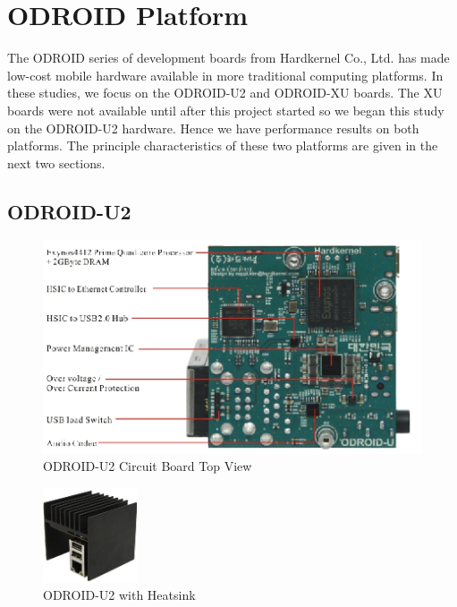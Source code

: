 \documentclass[11pt]{book}
\begin{document}
\section{ODROID Platform}

The ODROID series of development boards from Hardkernel Co., Ltd. has made low-cost mobile
hardware available in more traditional computing platforms.  In these studies, we focus on
the ODROID-U2 and ODROID-XU boards.  The XU boards were not available until after this
project started so we began this study on the ODROID-U2 hardware.  Hence we have
performance results on both platforms.  The principle characteristics of these two
platforms are given in the next two sections.

\subsection{ODROID-U2}

\begin{figure}
\includegraphics[width=\textwidth]{odroid_u2_top}
\caption{ODROID-U2 Circuit Board Top View \cite{odroid-u2-board-detail}}\label{odroid-u2-board}
\end{figure}

\begin{figure}
\centering
\includegraphics[width=0.25\textwidth]{odroid_u2}
\caption{ODROID-U2 with Heatsink \cite{odroid-u2-board-detail}}\label{odroid-u2}
\end{figure}
\end{document}
